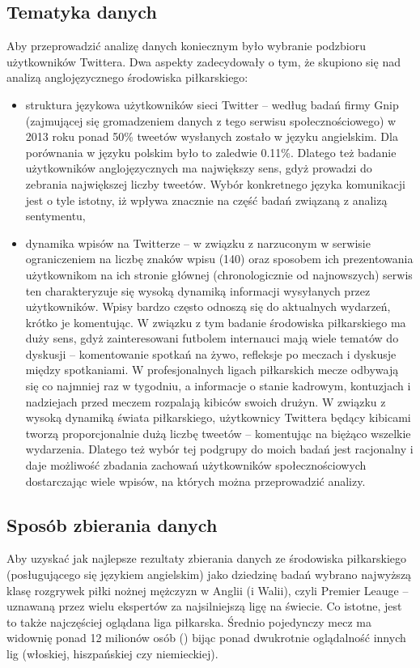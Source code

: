 \subsection{Tematyka danych}
Aby przeprowadzić analizę danych koniecznym było wybranie podzbioru
użytkowników Twittera. Dwa aspekty zadecydowały o tym, że skupiono się nad
analizą anglojęzycznego środowiska piłkarskiego:
\begin{itemize}   
  \item struktura językowa użytkowników sieci Twitter -- według badań firmy Gnip
  \cite{GnipTwitterLanguages} (zajmującej się gromadzeniem danych z tego serwisu
  społecznościowego) w 2013 roku ponad 50\% tweetów wysłanych zostało w języku
  angielskim.
  Dla porównania w języku polskim było to zaledwie 0.11\%.
  Dlatego też badanie użytkowników anglojęzycznych ma największy sens, gdyż
  prowadzi do zebrania największej liczby tweetów.
  Wybór konkretnego języka komunikacji jest o tyle istotny, iż wpływa znacznie
  na część badań związaną z analizą sentymentu,
  \item dynamika wpisów na Twitterze -- w związku z narzuconym w serwisie
  ograniczeniem na liczbę znaków wpisu (140) oraz sposobem ich prezentowania
  użytkownikom na ich stronie głównej (chronologicznie od najnowszych) serwis
  ten charakteryzuje się wysoką dynamiką informacji wysyłanych przez użytkowników.
  Wpisy bardzo często odnoszą się do aktualnych wydarzeń, krótko je komentując.
  W związku z tym badanie środowiska piłkarskiego ma duży sens, gdyż zainteresowani
  futbolem internauci mają wiele tematów do dyskusji -- komentowanie spotkań na żywo,
  refleksje po meczach i dyskusje między spotkaniami.
  W profesjonalnych ligach piłkarskich mecze odbywają się co najmniej raz w tygodniu,
  a informacje o stanie kadrowym, kontuzjach i nadziejach przed meczem
  rozpalają kibiców swoich drużyn. W związku z wysoką dynamiką świata piłkarskiego,
  użytkownicy Twittera będący kibicami tworzą proporcjonalnie dużą liczbę
  tweetów -- komentując na biężąco wszelkie wydarzenia. Dlatego też wybór
  tej podgrupy do moich badań jest racjonalny i daje możliwość zbadania 
  zachowań użytkowników społecznościowych dostarczając wiele wpisów, na których
  można przeprowadzić analizy.
\end{itemize}  


\subsection{Sposób zbierania danych}
Aby uzyskać jak najlepsze rezultaty zbierania danych ze środowiska piłkarskiego
(posługującego się językiem angielskim) jako dziedzinę badań wybrano
najwyższą klasę rozgrywek piłki nożnej mężczyzn w Anglii (i Walii),
czyli Premier Leauge -- uznawaną przez wielu ekspertów za najsilniejszą ligę na
świecie. Co istotne, jest to także najczęściej oglądana liga piłkarska.
Średnio pojedynczy mecz ma widownię ponad 12 milionów osób
(\cite{PremierLeagueAudience}) bijąc ponad dwukrotnie oglądalność innych lig 
(włoskiej, hiszpańskiej czy niemieckiej).


